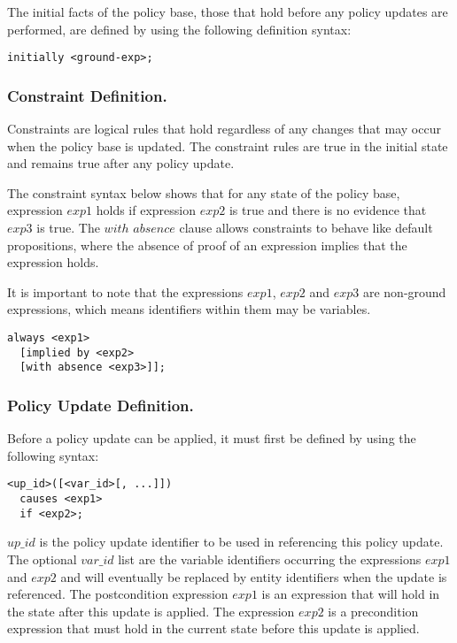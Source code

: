 \documentclass[11pt]{llncs}
\begin{document}
        The initial facts of the policy base, those that hold before any
        policy updates are performed, are defined by using the following
        definition syntax:

        \begin{verbatim}initially <ground-exp>;\end{verbatim}

      \subsubsection{Constraint Definition.}

        Constraints are logical rules that hold regardless of any changes
        that may occur when the policy base is updated. The constraint rules
        are true in the initial state and remains true after any policy
        update.

        The constraint syntax below shows that for any state of the policy
        base, expression $exp1$ holds if expression $exp2$ is true and there
        is no evidence that $exp3$ is true. The $with$ $absence$ clause
        allows constraints to behave like default propositions, where the
        absence of proof of an expression implies that the expression holds.

        It is important to note that the expressions $exp1$, $exp2$ and
        $exp3$ are non-ground expressions, which means identifiers within
        them may be variables.

        \begin{verbatim}always <exp1>
  [implied by <exp2>
  [with absence <exp3>]];\end{verbatim}

      \subsubsection{Policy Update Definition.}

        Before a policy update can be applied, it must first be defined by
        using the following syntax:

        \begin{verbatim}<up_id>([<var_id>[, ...]])
  causes <exp1>
  if <exp2>;\end{verbatim}

        $up\_id$ is the policy update identifier to be used in referencing
        this policy update. The optional $var\_id$ list are the variable
        identifiers occurring the expressions $exp1$ and $exp2$ and will
        eventually be replaced by entity identifiers when the update is
        referenced. The postcondition expression $exp1$ is an expression that
        will hold in the state after this update is applied. The expression
        $exp2$ is a precondition expression that must hold in the current
        state before this update is applied.
\end{document}
